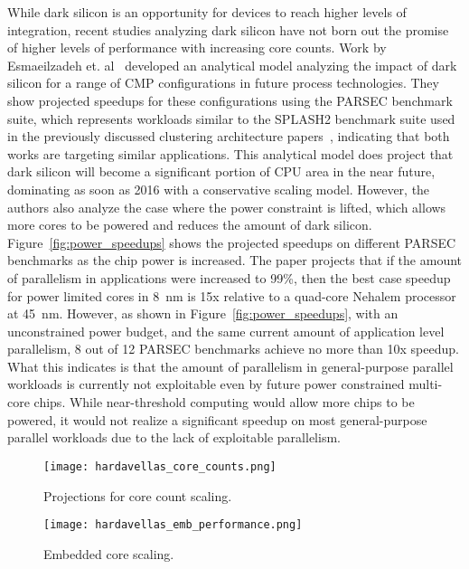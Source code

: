 While dark silicon is an opportunity for devices to reach higher levels of
integration, recent studies analyzing dark silicon have not born out the promise
of higher levels of performance with increasing core counts.  Work by
Esmaeilzadeh et. al~\cite{Esmaeilzadeh2011Dark-silicon-an} developed an
analytical model analyzing the impact of dark silicon for a range of CMP
configurations in future process technologies. They show projected speedups for
these configurations using the PARSEC benchmark suite,
which represents workloads similar to the SPLASH2 benchmark suite used in the
previously discussed clustering architecture
papers~\cite{dreslinski2010near,Zhai:2007kn}, indicating that both works are targeting
similar applications. This analytical model does project that dark silicon will
become a significant portion of CPU area in the near future, dominating as soon as
2016 with a conservative scaling model. However, the authors also analyze
the case where the power constraint is lifted, which allows more cores to
be powered and reduces the amount of dark silicon. Figure~\ref{fig:power_speedups} shows the projected speedups on different PARSEC
benchmarks as the chip power is increased. The paper projects that if the amount of parallelism in applications
were increased to 99\%, then the best case speedup for power limited cores in
\SI{8}{\nano\meter} is 15x relative to a quad-core Nehalem processor at
\SI{45}{\nano\meter}. However, as shown in Figure~\ref{fig:power_speedups}, with
an unconstrained power budget, and the same current amount of application level
parallelism, 8 out of 12 PARSEC benchmarks achieve no more than 10x speedup.
What this indicates is that the amount of parallelism in general-purpose
parallel workloads is currently not exploitable even by future power constrained
multi-core chips. While near-threshold computing would allow more chips to be
powered, it would not realize a significant speedup on most general-purpose
parallel workloads due to the lack of exploitable parallelism.

\begin{figure}[thpb] \centering
\texttt{[image: hardavellas\_core\_counts.png]}
\caption{Projections for core count scaling.~\cite{Hardavellas:2011de}}
\label{fig:core_counts} \end{figure}

\begin{figure}[thpb] \centering
\texttt{[image: hardavellas\_emb\_performance.png]}
\caption{Embedded core scaling.~\cite{Hardavellas:2011de}}
\label{fig:emb_performance} \end{figure}

